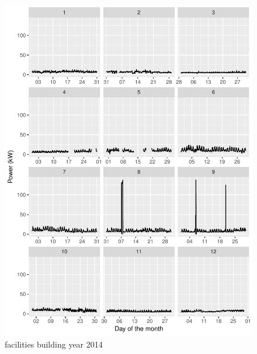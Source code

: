 \documentclass[11pt, oneside]{article}   	%
\begin{document}
\begin{figure}
\includegraphics[keepaspectratio]{facilities_build_Y2014.pdf}
\caption{facilities building year 2014 }
\end{figure}
\end{document}
